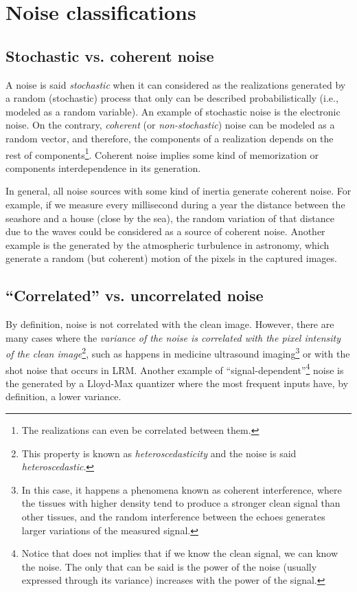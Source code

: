
\section{Noise classifications}

\subsection{Stochastic vs. coherent noise}

A noise is said \emph{stochastic} when it can considered as the
realizations generated by a random (stochastic) process that only can
be described probabilistically (i.e., modeled as a random
variable). An example of stochastic noise is the electronic noise. On
the contrary, \emph{coherent} (or \emph{non-stochastic}) noise can be
modeled as a random vector, and therefore, the components of a
realization depends on the rest of components\footnote{The
  realizations can even be correlated between them.}. Coherent noise
implies some kind of memorization or components interdependence in its
generation.

In general, all noise sources with some kind of inertia generate
coherent noise. For example, if we measure every millisecond during a
year the distance between the seashore and a house (close by the
sea), the random variation of that distance due to the waves could be
considered as a source of coherent noise. Another example is the
generated by the atmospheric turbulence in astronomy, which generate a
random (but coherent) motion of the pixels in the captured images.


\subsection{``Correlated'' vs. uncorrelated noise}

By definition, noise is not correlated with the clean image. However,
there are many cases where the \emph{variance of the noise is
correlated with the pixel intensity of the clean image}\footnote{This
property is known as \emph{heteroscedasticity} and the noise is said
\emph{heteroscedastic}.}, such as happens in medicine ultrasound
imaging\footnote{In this case, it happens a phenomena known as
coherent interference, where the tissues with higher density tend to
produce a stronger clean signal than other tissues, and the random
interference between the echoes generates larger variations of the
measured signal.} or with the shot noise that occurs in
\gls{LRM}. Another example of ``signal-dependent''\footnote{Notice
that does not implies that if we know the clean signal, we can know
the noise. The only that can be said is the power of the noise
(usually expressed through its variance) increases with the power of
the signal.} noise is the generated by a Lloyd-Max quantizer where the
most frequent inputs have, by definition, a lower variance.


